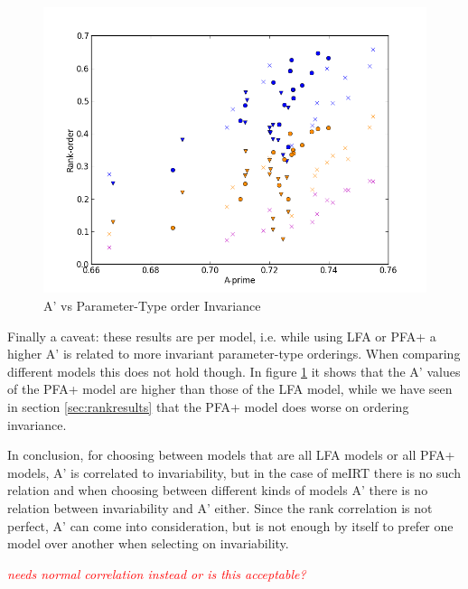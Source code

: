 \documentclass{scrartcl}
\newcommand\todo[1]{\textit{\textcolor{red}{#1}}}
\begin{document}
\begin{figure}[h]
\centering
\includegraphics[width=140mm]{images/allaprimes.png}
\caption{A' vs Parameter-Type order Invariance}
\label{fig:ap}
\end{figure}

Finally a caveat: these results are per model, i.e. while using LFA or PFA+ a higher A' is related to more invariant parameter-type orderings. When comparing different models this does not hold though. In figure \ref{fig:ap} it shows that the A' values of the PFA+ model are higher than those of the LFA model, while we have seen in section \ref{sec:rankresults} that the PFA+ model does worse on ordering invariance. 

In conclusion, for choosing between models that are all LFA models or all PFA+ models, A' is correlated to invariability, but in the case of meIRT there is no such relation and when choosing between different kinds of models A' there is no relation between invariability and A' either. Since the rank correlation is not perfect, A' can come into consideration, but is not enough by itself to prefer one model over another when selecting on invariability.

\todo{needs normal correlation instead or is this acceptable?}
\end{document}
